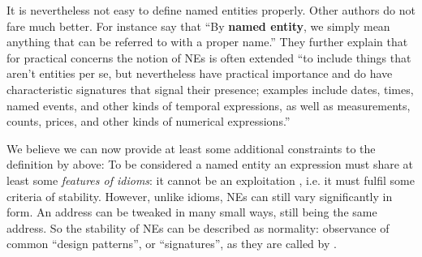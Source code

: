 It is nevertheless not easy to define named entities properly. Other authors do not fare much better.
For instance \citet{salp} say that ``By \textbf{named entity}, we simply mean anything that can be referred to with a proper name.'' They further explain that for practical concerns the notion of NEs is often extended ``to include things that aren't entities per se, but nevertheless have practical importance and do have characteristic signatures that signal their presence; examples include dates, times, named events, and other kinds of temporal expressions, as well as measurements, counts, prices, and other kinds of numerical expressions.''

We believe we can now provide at least some additional constraints to the definition by \citeauthor{sevcikova:2007} above: To be considered a named entity an expression must share at least some 
\emph{features of idioms}: it cannot be an exploitation \citep[see][]{hanks:norms}, i.e. it must fulfil some criteria of stability. However, unlike idioms, NEs can still vary significantly in form. An address can be tweaked in many small ways, still being the same address. So the stability of NEs can be described as normality: observance of common ``design patterns'', or ``signatures'', as they are called by \citeauthor{salp}. 



